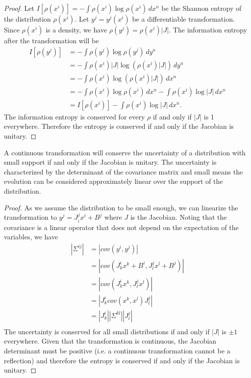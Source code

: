 \documentclass[10pt,twocolumn, nofootinbib]{revtex4-2}
\begin{document}
\begin{proof}
	Let $I[\rho(x^i)] = - \int \rho(x^i) \log \rho(x^i) \, dx^n$ be the Shannon entropy of the distribution $\rho(x^i)$. Let $y^j=y^j(x^i)$ be a differentiable transformation. Since $\rho(x^i)$ is a density, we have $\rho(y^j) = \rho(x^i) |J|$. The information entropy after the transformation will be
	\begin{align*}
		I[\rho(y^j)] &= - \int \rho(y^j) \log \rho(y^j) \, dy^n \\
		&= - \int \rho(x^i) |J| \log \left( \rho(x^i) |J| \right) \, dy^n \\
		&= - \int \rho(x^i) \log \left( \rho(x^i) |J| \right) \, dx^n \\
		&= - \int \rho(x^i) \log \rho(x^i) \, dx^n - \int \rho(x^i) \log |J| \, dx^n \\
		&= I[\rho(x^i)] - \int \rho(x^i) \log |J| \, dx^n.
	\end{align*}
	The information entropy is conserved for every $\rho$ if and only if $|J|$ is 1 everywhere. Therefore the entropy is conserved if and only if the Jacobian is unitary.
\end{proof}

\begin{prop}
	A continuous transformation will conserve the uncertainty of a distribution with small support if and only if the Jacobian is unitary. The uncertainty is characterized by the determinant of the covariance matrix and small means the evolution can be considered approximately linear over the support of the distribution.
\end{prop}

\begin{proof}
	As we assume the distribution to be small enough, we can linearize the transformation to $y^j = J^j_i x^i + B^j$ where $J$ is the Jacobian. Noting that the covariance is a linear operator that does not depend on the expectation of the variables, we have
	\begin{align*}
		|\Sigma^{ij}| &= |cov(y^i, y^j)| \\
		&= |cov(J^i_k x^k + B^i, J^j_l x^l + B^j)| \\
		&= |cov(J^i_k x^k , J^j_l x^l )| \\
		&= |J^i_k cov(x^k , x^l ) J^j_l| \\
		&= |J^i_k | | \Sigma^{kl} | | J^j_l| \\
	\end{align*}
	The uncertainty is conserved for all small distributions if and only if $|J|$ is $\pm 1$ everywhere. Given that the transformation is continuous, the Jacobian determinant must be positive (i.e. a continuous transformation cannot be a reflection) and therefore the entropy is conserved if and only if the Jacobian is unitary.
\end{proof}
\end{document}

